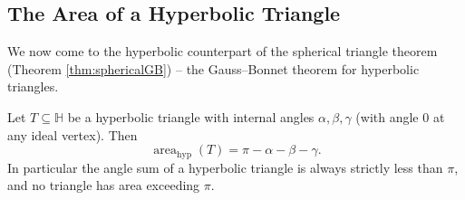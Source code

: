 \documentclass[a4paper]{scrartcl}
\newcommand{\HH}{\mathbb{H}}
\begin{document}
\subsection{The Area of a Hyperbolic Triangle}

We now come to the hyperbolic counterpart of the spherical triangle theorem (Theorem \ref{thm:sphericalGB}) -- the Gauss--Bonnet theorem for hyperbolic triangles.

\begin{theorem}\label{thm:hyperbolicGB}
    Let $T \subseteq \HH$ be a hyperbolic triangle with internal angles $\alpha, \beta, \gamma$ (with angle $0$ at any ideal vertex). Then
    $$
    \operatorname{area}_{\mathrm{hyp}}(T) = \pi - \alpha - \beta - \gamma.
    $$
    In particular the angle sum of a hyperbolic triangle is always strictly less than $\pi$, and no triangle has area exceeding $\pi$.
\end{theorem}
\end{document}
